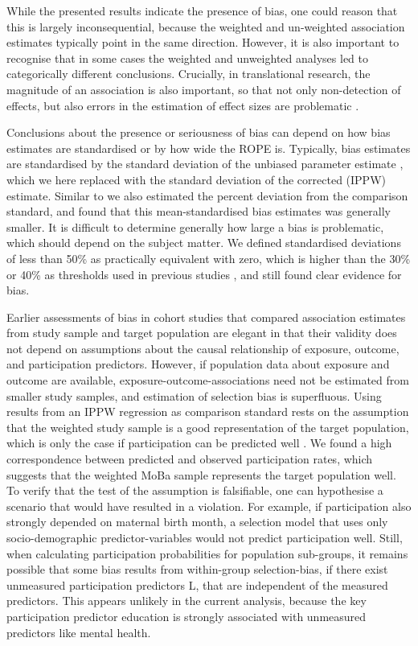 \documentclass[12pt]{article}
\begin{document}
While the presented results indicate the presence of bias, one could reason that this is largely inconsequential, because the weighted and un-weighted association estimates typically point in the same direction. However, it is also important to recognise that in some cases the weighted and unweighted analyses led to categorically different conclusions. Crucially, in translational research, the magnitude of an association is also important, so that not only non-detection of effects, but also errors in the estimation of effect sizes are problematic \cite{Sullivan2012-uc}.

Conclusions about the presence or seriousness of bias can depend on how bias estimates are standardised or by how wide the ROPE is. Typically, bias estimates are standardised by the standard deviation of the unbiased parameter estimate \cite{Stuart2010-cj}, which we here replaced with the standard deviation of the corrected (IPPW) estimate. Similar to \citeauthor{Nilsen2009-ci} \cite{Nilsen2009-ci} we also estimated the percent deviation from the comparison standard, and found that this mean-standardised bias estimates was generally smaller. It is difficult to determine generally how large a bias is problematic, which should depend on the subject matter. We defined standardised deviations of less than 50\%  as practically equivalent with zero, which is higher than the 30\% or 40\% as thresholds used in previous studies \cite{Greene2011-am, Stuart2010-cj}, and still found clear evidence for bias.

Earlier assessments of bias in cohort studies that compared association estimates from study sample and target population are elegant in that their validity does not depend on assumptions about the causal relationship of exposure, outcome, and participation predictors. However, if population data about exposure and outcome are available, exposure-outcome-associations need not be estimated from smaller study samples, and estimation of selection bias is superfluous. Using results from an IPPW regression as comparison standard rests on the assumption that the weighted study sample is a good representation of the target population, which is only the case if participation can be predicted well \cite{Seaman2013-rj}. We found a high correspondence between predicted and observed participation rates, which suggests that the weighted MoBa sample represents the target population well. To verify that the test of the assumption is falsifiable, one can hypothesise a scenario that would have resulted in a violation. For example, if participation also strongly depended on maternal birth month, a selection model that uses only socio-demographic predictor-variables would not predict participation well.  Still, when calculating participation probabilities for population sub-groups, it remains possible that some bias results from within-group selection-bias, if there exist unmeasured participation predictors L, that are independent of the measured predictors. This appears unlikely in the current analysis, because the key participation predictor education is strongly associated with unmeasured predictors like mental health.
\end{document}
